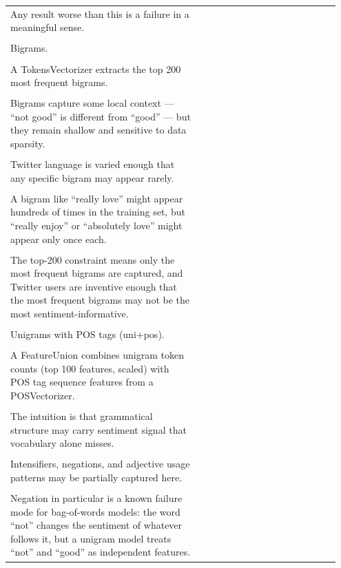 \documentclass[11pt]{article}
\begin{document}
\begin{longtable}{|p{0.55\linewidth}|p{0.40\linewidth}|}
\hline
\rule{0pt}{3.5cm} & \\
\hline
Any result worse than this is a failure in a meaningful sense. & \\[2pt]
\hline
\rule{0pt}{3.5cm} & \\
\hline
Bigrams. & \\[2pt]
\hline
\rule{0pt}{3.5cm} & \\
\hline
A TokensVectorizer extracts the top 200 most frequent bigrams. & \\[2pt]
\hline
\rule{0pt}{3.5cm} & \\
\hline
Bigrams capture some local context --- ``not good'' is different from ``good'' --- but they remain shallow and sensitive to data sparsity. & \\[2pt]
\hline
\rule{0pt}{3.5cm} & \\
\hline
Twitter language is varied enough that any specific bigram may appear rarely. & \\[2pt]
\hline
\rule{0pt}{3.5cm} & \\
\hline
A bigram like ``really love'' might appear hundreds of times in the training set, but ``really enjoy'' or ``absolutely love'' might appear only once each. & \\[2pt]
\hline
\rule{0pt}{3.5cm} & \\
\hline
The top-200 constraint means only the most frequent bigrams are captured, and Twitter users are inventive enough that the most frequent bigrams may not be the most sentiment-informative. & \\[2pt]
\hline
\rule{0pt}{3.5cm} & \\
\hline
Unigrams with POS tags (uni+pos). & \\[2pt]
\hline
\rule{0pt}{3.5cm} & \\
\hline
A FeatureUnion combines unigram token counts (top 100 features, scaled) with POS tag sequence features from a POSVectorizer. & \\[2pt]
\hline
\rule{0pt}{3.5cm} & \\
\hline
The intuition is that grammatical structure may carry sentiment signal that vocabulary alone misses. & \\[2pt]
\hline
\rule{0pt}{3.5cm} & \\
\hline
Intensifiers, negations, and adjective usage patterns may be partially captured here. & \\[2pt]
\hline
\rule{0pt}{3.5cm} & \\
\hline
Negation in particular is a known failure mode for bag-of-words models: the word ``not'' changes the sentiment of whatever follows it, but a unigram model treats ``not'' and ``good'' as independent features. & \\[2pt]

\end{longtable}
\end{document}

